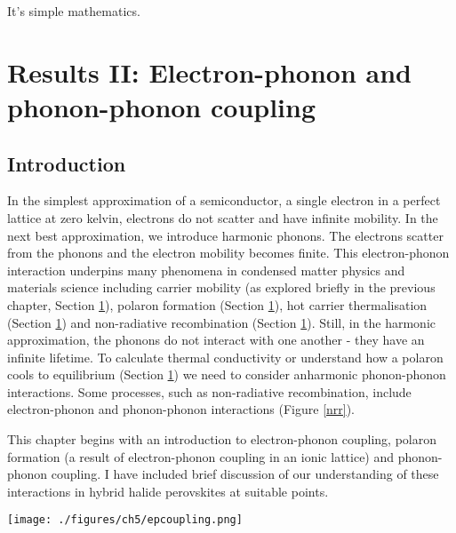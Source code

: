 \begin{savequote}[8cm]
It's simple mathematics.
\end{savequote}

\chapter{\label{ch:5-epcoupling}Results II: Electron-phonon and phonon-phonon coupling}
\section{Introduction} \label{ch5:introduction}

In the simplest approximation of a semiconductor, a single electron in a perfect lattice at zero kelvin, electrons do not scatter and have infinite mobility. In the next best approximation, we introduce harmonic phonons. The electrons scatter from the phonons and the electron mobility becomes finite. This electron-phonon interaction underpins many phenomena in condensed matter physics and materials science including carrier mobility (as explored briefly in the previous chapter, Section \ref{}), polaron formation (Section \ref{}), hot carrier thermalisation (Section \ref{}) and non-radiative recombination (Section \ref{}). Still, in the harmonic approximation, the phonons do not interact with one another - they have an infinite lifetime. To calculate thermal conductivity or understand how a polaron cools to equilibrium (Section \ref{}) we need to consider anharmonic phonon-phonon interactions. Some processes, such as non-radiative recombination, include electron-phonon and phonon-phonon interactions (Figure \ref{nrr}).

This chapter begins with an introduction to electron-phonon coupling, polaron formation (a result of electron-phonon coupling in an ionic lattice) and phonon-phonon coupling. I have included brief discussion of our understanding of these interactions in hybrid halide perovskites at suitable points.

\begin{figure*}
\texttt{[image: ./figures/ch5/epcoupling.png]}
\caption[Quasi-particle interactions during non-radiative recombination]{
}
\label{nrr}
\end{figure*}

